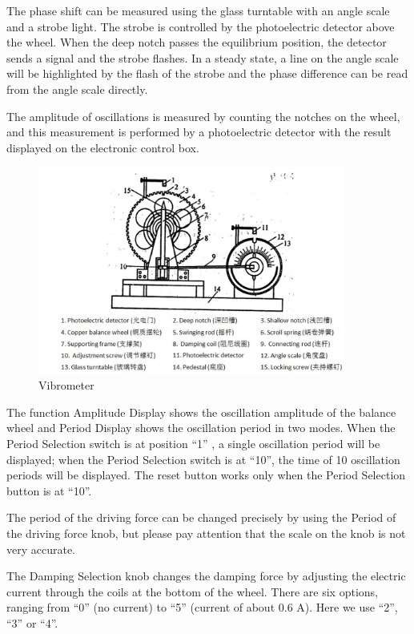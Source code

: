 The phase shift can be measured using the glass turntable with an angle scale
and a strobe light.
The strobe is controlled by the photoelectric detector above the wheel. 
When the deep notch passes the equilibrium position, the detector
sends a signal and the strobe flashes.
In a steady state, a line on the angle scale will be highlighted by the flash of
the strobe and the phase difference can be read from the angle scale directly. 

The amplitude of oscillations is measured by counting the notches on the wheel,
and this measurement is performed by a photoelectric detector with the result
displayed on the electronic control box. 

\begin{figure}[H]
\centering
\includegraphics[width=0.9\textwidth]{fig/es2}
\caption{Vibrometer}\label{vib}
\end{figure}

The function Amplitude Display shows the oscillation amplitude of the balance
wheel and Period Display shows the oscillation period in two modes.
When the Period Selection switch is at position ``1'' , a single oscillation
period will be displayed; when the Period Selection switch is at ``10'', the
time of 10 oscillation periods will be displayed.
The reset button works only when the
Period Selection button is at ``10''. 
    
The period of the driving force can be changed precisely by using the Period of
the driving force knob, but please pay attention that the scale on the knob is
not very accurate. 

The Damping Selection knob changes the damping force by adjusting the electric
current through the coils at the bottom of the wheel.
There are six options, ranging from ``0'' (no current) to ``5'' (current of
about 0.6 A). Here we use ``2'', ``3'' or ``4''. 

